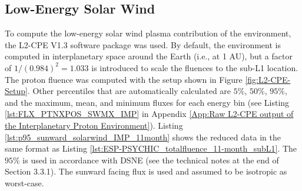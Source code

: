 \documentclass{hitec}
\begin{document}
\clearpage %

\subsection{Low-Energy Solar Wind}
\label{ssec:natenv-Low-Energy Solar Wind}

To compute the low-energy solar wind plasma contribution of the environment, the L2-CPE V1.3 software package was used. By default, the environment is computed in interplanetary space around the Earth (i.e., at 1 AU), but a factor of $1/(0.984)^2 = 1.033$ is introduced to scale the fluences to the sub-L1 location. The proton fluence was computed with the setup shown in Figure \ref{fig:L2-CPE-Setup}. Other percentiles that are automatically calculated are $5\%$, $50\%$, $95\%$, and the maximum, mean, and minimum fluxes for each energy bin (see Listing \ref{lst:FLX_PTNXPOS_SWMX_IMP} in Appendix \ref{App:Raw L2-CPE output of the Interplanetary Proton Environment}). Listing \ref{lst:p95_sunward_solarwind_IMP_11month} shows the reduced data in the same format as Listing \ref{lst:ESP-PSYCHIC_totalfluence_11-month_subL1}. The $95\%$ is used in accordance with DSNE (see the technical notes at the end of Section 3.3.1). The sunward facing flux is used and assumed to be isotropic as worst-case. 
\end{document}
